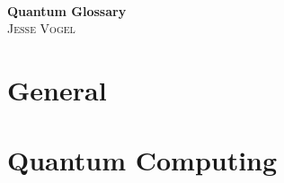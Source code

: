 \documentclass[10pt]{report}
\begin{document}
\thispagestyle{empty}

\begin{center}
    \; \\ \vspace{4cm} \textbf{\Huge Quantum Glossary}
    \\ \vspace{2cm}
    \textsc{Jesse Vogel}
\end{center}

\newpage

{
    \tableofcontents
}

\newcommand{\cat}{}

\chapter{General}
\renewcommand{\cat}{GEN}


\chapter{Quantum Computing}
\renewcommand{\cat}{COM}



\end{document}
